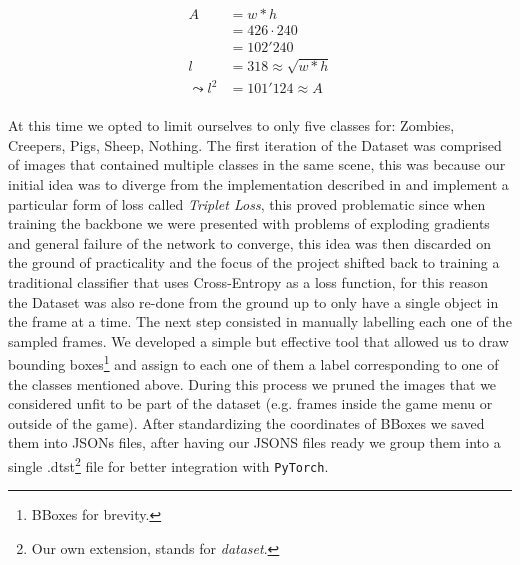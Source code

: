 \documentclass[10pt,journal,cspaper,compsoc]{IEEEtran}
\newcommand{\code}[1]{\texttt{#1}}
\begin{document}
    \begin{equation}\label{eq:area}
        \begin{aligned}
            A &= w * h \\
            &= 426 \cdot 240\\ 
            &= 102'240\\
            l &= 318 \approx \sqrt{w * h}\\
            \leadsto l^2 &= 101'124 \approx A\\
        \end{aligned}
    \end{equation} 
    
    At this time we opted to limit ourselves to only five classes for: Zombies, Creepers, Pigs, Sheep, Nothing.
    The first iteration of the Dataset was comprised of images that contained multiple classes in the same scene, this was because our initial idea was to diverge from the implementation described in \cite{arxiv:FasterRCNN} and implement a particular form of loss called \emph{Triplet Loss}\cite{Chechik:Triplet}, this proved problematic since when training the backbone we were presented with problems of exploding gradients and general failure of the network to converge, this idea was then discarded on the ground of practicality and the focus of the 
    project shifted back to training a traditional classifier that uses Cross-Entropy as a loss function, for this reason the Dataset was also re-done from the ground up to only have a single object in the frame at a time.
    The next step consisted in manually labelling each one of the sampled frames. We developed a simple but effective tool that allowed us to draw bounding boxes\footnote{BBoxes for brevity.} and assign to each one of them a label corresponding to one of the classes mentioned above. During this process we pruned the images that we considered
    unfit to be part of the dataset (e.g. frames inside the game menu or outside of the game). After standardizing the coordinates of BBoxes we saved them into JSONs files, after having our JSONS files ready we group them into a single .dtst\footnote{Our own extension, stands for \emph{dataset}.} file for better integration with \code{PyTorch}.
    
\end{document}
